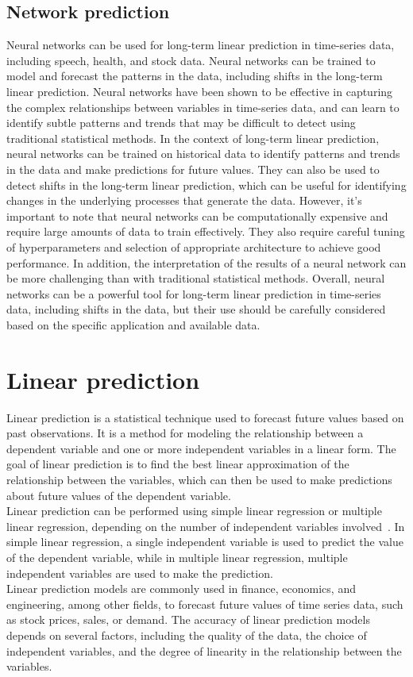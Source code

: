 \subsection{Network prediction} \label{subsec:nnprediction}
Neural networks can be used for long-term linear prediction in time-series data, including speech, health, and
stock data. Neural networks can be trained to model and forecast the patterns in the data, including shifts in
the long-term linear prediction. Neural networks have been shown to be effective in capturing the complex relationships
between variables in time-series data, and can learn to identify subtle patterns and trends that may be difficult
to detect using traditional statistical methods. In the context of long-term linear prediction, neural networks can be
trained on historical data to identify patterns and trends in the data and make predictions for future values.
They can also be used to detect shifts in the long-term linear prediction, which can be useful for identifying
changes in the underlying processes that generate the data. However, it's important to note that neural networks
can be computationally expensive and require large amounts of data to train effectively. They also require careful
tuning of hyperparameters and selection of appropriate architecture to achieve good performance.
In addition, the interpretation of the results of a neural network can be more challenging than with traditional
statistical methods. Overall, neural networks can be a powerful tool for long-term linear prediction in time-series
data, including shifts in the data, but their use should be carefully considered based on the specific
application and available data.


\section{Linear prediction} \label{sec:lp}
Linear prediction is a statistical technique used to forecast future values based on past observations. It is a method
for modeling the relationship between a dependent variable and one or more independent variables in a linear form.
The goal of linear prediction is to find the best linear approximation of the relationship between the variables,
which can then be used to make predictions about future values of the dependent variable.
\\
Linear prediction can be performed using simple linear regression or multiple linear regression, depending on the
number of independent variables involved~\cite{Parks}. In simple linear regression, a single independent variable is
used to predict the value of the dependent variable, while in multiple linear regression, multiple independent
variables are used to make the prediction.
\\
Linear prediction models are commonly used in finance, economics, and engineering, among other fields, to forecast
future values of time series data, such as stock prices, sales, or demand. The accuracy of linear prediction models
depends on several factors, including the quality of the data, the choice of independent variables, and the degree of
linearity in the relationship between the variables.

